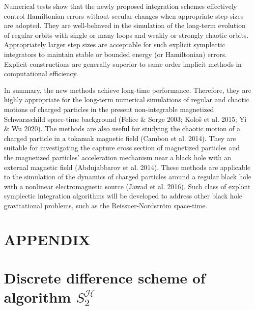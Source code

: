 \documentclass[preprint2]{aastex}
\begin{document}
Numerical tests show that the newly proposed integration schemes
effectively control Hamiltonian errors without secular changes
when appropriate step sizes are adopted. They are well-behaved in
the simulation of the long-term evolution of regular orbits with
single or many loops and weakly or strongly chaotic orbits.
Appropriately larger step sizes are acceptable for such explicit
symplectic integrators to maintain stable or bounded energy (or
Hamiltonian) errors. Explicit constructions are generally superior
to same order implicit methods in computational efficiency.

In summary, the new methods achieve long-time performance.
Therefore, they are highly appropriate for the long-term numerical
simulations of regular and chaotic motions of charged particles in
the present non-integrable magnetized Schwarzschild space-time
background (Felice $\&$ Sorge 2003; Kolo\v{s} et al. 2015; Yi $\&$
Wu 2020). The methods are also useful for studying the chaotic
motion of a charged particle in a tokamak magnetic field (Cambon
et al. 2014). They are suitable for investigating the capture
cross section of magnetized particles and the magnetized
particles' acceleration mechanism near a black hole with an
external magnetic field (Abdujabbarov et al. 2014). These methods
are applicable to the simulation of the dynamics of charged
particles around a regular black hole with a nonlinear
electromagnetic source (Jawad et al. 2016). Such class of explicit
symplectic integration algorithms will be developed to address
other black hole gravitational problems, such as the
Reissner-Nordstr\"{o}m space-time.

\appendix
\section*{APPENDIX}

\section{Discrete difference scheme of algorithm $S^{\mathcal{H}}_2$}
\end{document}
